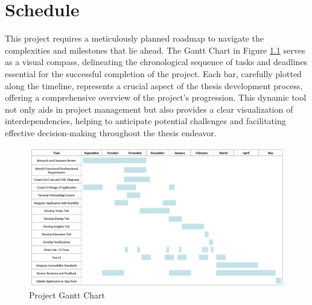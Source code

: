 \chapter{Schedule}

This project requires a meticulously planned roadmap to navigate the complexities and milestones that lie ahead. The Gantt Chart in Figure \ref{fig:project-gantt-chart} serves as a visual compass, delineating the chronological sequence of tasks and deadlines essential for the successful completion of the project. Each bar, carefully plotted along the timeline, represents a crucial aspect of the thesis development process, offering a comprehensive overview of the project's progression. This dynamic tool not only aids in project management but also provides a clear visualization of interdependencies, helping to anticipate potential challenges and facilitating effective decision-making throughout the thesis endeavor.

\begin{figure} [H]
    \centering
    \includegraphics[width=1\linewidth]{thesis//chapters//images/ganttChart.png}
    \caption{Project Gantt Chart}
    \label{fig:project-gantt-chart}
\end{figure}

